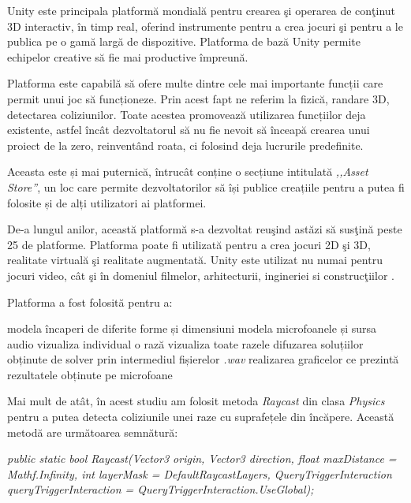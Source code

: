	Unity este principala platform\u{a} mondial\u{a} pentru crearea \c{s}i operarea de con\c{t}inut 3D interactiv, \^{i}n timp real, oferind instrumente pentru a crea jocuri \c{s}i pentru a le publica pe o gam\u{a} larg\u{a} de dispozitive. Platforma de baz\u{a} Unity permite echipelor creative s\u{a} fie mai productive \^{i}mpreun\u{a}.
	
	Platforma este capabilă să ofere multe dintre cele mai importante funcții care permit unui joc să funcționeze. Prin acest fapt ne referim la fizică, randare 3D, detectarea coliziunilor. Toate acestea promovează utilizarea funcțiilor deja existente, astfel încât dezvoltatorul să nu fie nevoit să înceapă crearea unui proiect de la zero, reinventând roata, ci folosind deja lucrurile predefinite.
	
	Aceasta este și mai puternică, întrucât conține o secțiune intitulată \textit{,,Asset Store''}, un loc care permite dezvoltatorilor să își publice creațiile pentru a putea fi folosite și de alți utilizatori ai platformei.
	
	De-a lungul anilor, aceast\u{a} platform\u{a} s-a dezvoltat reu\c{s}ind ast\u{a}zi s\u{a} sus\c{t}in\u{a} peste 25 de platforme. Platforma poate fi utilizat\u{a} pentru a crea jocuri 2D \c{s}i 3D, realitate virtual\u{a} \c{s}i realitate augmentat\u{a}. Unity este utilizat nu numai pentru jocuri video, c\^{a}t \c{s}i \^{i}n domeniul filmelor, arhitecturii, ingineriei si construc\c{t}iilor \cite{unity}.
	
	Platforma a fost folosită pentru a:
	
	\begin{itemize}
		\utb modela încaperi de diferite forme și dimensiuni
		\utb modela microfoanele și sursa audio
		\utb vizualiza individual o rază 
		\utb vizualiza toate razele
		\utb difuzarea soluțiilor obținute de solver prin intermediul fișierelor \textit{.wav}
		\utb realizarea graficelor ce prezintă rezultatele obținute pe microfoane
	\end{itemize}

	Mai mult de atât, în acest studiu am folosit metoda \textit{Raycast} din clasa \textit{Physics} pentru a putea detecta coliziunile unei raze cu suprafețele din încăpere. Această metodă are următoarea semnătură:
	
	\begin{itemize}
		\utb \textit{public static bool Raycast(Vector3 origin, Vector3 direction, float maxDistance = Mathf.Infinity, int layerMask = DefaultRaycastLayers, QueryTriggerInteraction queryTriggerInteraction = QueryTriggerInteraction.UseGlobal);}
	\end{itemize}

